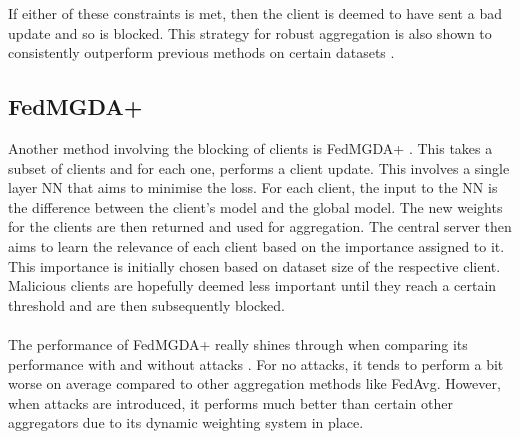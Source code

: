 If either of these constraints is met, then the client is deemed to have sent a bad update and so is blocked.
This strategy for robust aggregation is also shown to consistently outperform previous methods on certain datasets \cite{robagg_health}.

\subsection{FedMGDA+}
Another method involving the blocking of clients is FedMGDA+ \cite{fedmgda}. 
This takes a subset of clients and for each one, performs a client update.
This involves a single layer NN that aims to minimise the loss.
For each client, the input to the NN is the difference between the client's model and the global model.
The new weights for the clients are then returned and used for aggregation.
The central server then aims to learn the relevance of each client based on the importance assigned to it. 
This importance is initially chosen based on dataset size of the respective client.
Malicious clients are hopefully deemed less important until they reach a certain threshold and are then subsequently blocked.
\\ \\
The performance of FedMGDA+ really shines through when comparing its performance with and without attacks \cite{fedmgda}.
For no attacks, it tends to perform a bit worse on average compared to other aggregation methods like FedAvg.
However, when attacks are introduced, it performs much better than certain other aggregators due to its dynamic weighting system in place.

